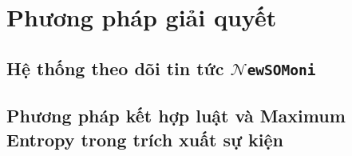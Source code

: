
\chapter{Phương pháp giải quyết} %



\ifpdf
    \graphicspath{{X/figures/PNG/}{X/figures/PDF/}{X/figures/}}
\else
    \graphicspath{{X/figures/EPS/}{X/figures/}}
\fi







\section{Hệ thống theo dõi tin tức $\mathcal{N}$\texttt{ewSOMoni}}


\section{Phương pháp kết hợp luật và Maximum Entropy trong trích xuất sự kiện}



